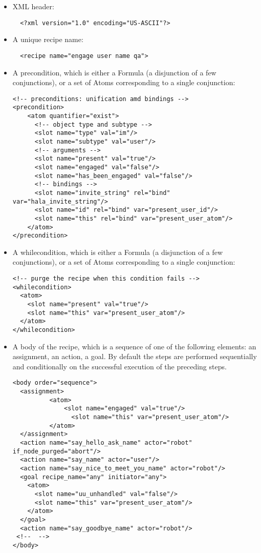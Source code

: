 \begin{itemize}
\item XML header: 
\begin{lstlisting}
  <?xml version="1.0" encoding="US-ASCII"?>
\end{lstlisting}

\item A unique recipe name: 
\begin{lstlisting}
  <recipe name="engage user name qa">
\end{lstlisting}

\item A precondition, which is either a Formula (a disjunction of a few conjunctions), or a set of Atoms corresponding to a single conjunction: 
\begin{lstlisting}
<!-- preconditions: unification amd bindings -->
<precondition>
    <atom quantifier="exist">
      <!-- object type and subtype -->
      <slot name="type" val="im"/>
      <slot name="subtype" val="user"/>
      <!-- arguments -->
      <slot name="present" val="true"/>
      <slot name="engaged" val="false"/>
      <slot name="has_been_engaged" val="false"/>
      <!-- bindings -->
      <slot name="invite_string" rel="bind" var="hala_invite_string"/>
      <slot name="id" rel="bind" var="present_user_id"/>
      <slot name="this" rel="bind" var="present_user_atom"/>
    </atom>
</precondition>
\end{lstlisting}

\item A whilecondition, which is either a Formula (a disjunction of a few conjunctions), or a set of Atoms corresponding to a single conjunction:
\begin{lstlisting}
<!-- purge the recipe when this condition fails -->
<whilecondition>
  <atom>
    <slot name="present" val="true"/>
    <slot name="this" var="present_user_atom"/>
  </atom>
</whilecondition>
\end{lstlisting}

\item A body of the recipe, which is a sequence of one of the following elements: an assignment, an action, a goal. By default the steps are performed sequentially and conditionally on the successful execution of the preceding steps. 

\begin{lstlisting}
<body order="sequence">
  <assignment>
          <atom>
              <slot name="engaged" val="true"/>
                <slot name="this" var="present_user_atom"/>
          </atom>
  </assignment>
  <action name="say_hello_ask_name" actor="robot" if_node_purged="abort"/>
  <action name="say_name" actor="user"/>
  <action name="say_nice_to_meet_you_name" actor="robot"/>
  <goal recipe_name="any" initiator="any">
    <atom>
      <slot name="uu_unhandled" val="false"/>
      <slot name="this" var="present_user_atom"/>
    </atom>
  </goal>
  <action name="say_goodbye_name" actor="robot"/>
 <!--  -->
</body>
\end{lstlisting}


\end{itemize}
